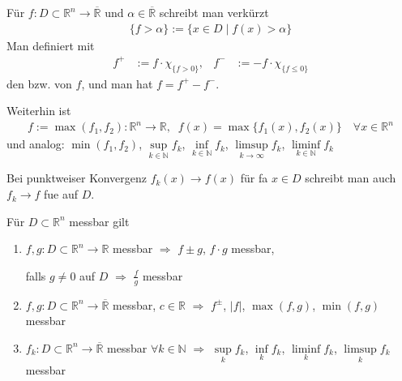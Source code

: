 \begin{*definition}
Für $f:D\subset\mathbb{R}^n\to\overline{\mathbb{R}}$ und $\alpha\in\overline{\mathbb{R}}$ schreibt man verkürzt
\begin{align*}
\{ f > \alpha \} := \{ x\in D \mid f(x) > \alpha \}
\end{align*}
Man definiert mit \begin{align*}
	f^{+} &:= f\cdot \chi_{\{f > 0\}}, & f^{-} &:= -f\cdot \chi_{\{f \le 0\}}
\end{align*}
den  bzw.  von $f$, und man hat $f = f^+ - f^-$.

Weiterhin ist 
\begin{align*}
f:=\max(f_1, f_2):\mathbb{R}^n\to\mathbb{R},\;\;f(x) = \max \{ f_1(x), f_2(x) \} \quad \forall x\in\mathbb{R}^n
\end{align*}
und analog: $\min(f_1, f_2)$, $\sup\limits_{k\in\mathbb{N}} f_k$, $\inf\limits_{k\in\mathbb{N}} f_k$, $\limsup\limits_{k\to\infty} f_k$, $\liminf\limits_{k\in\mathbb{N}} f_k$

Bei punktweiser Konvergenz $f_k(x)\to f(x)$ für \gls{fa} $x\in D$ schreibt man auch $f_k\to f$ \gls{fue} auf $D$.
\end{*definition}

\begin{proposition}
	Für $D\subset\mathbb{R}^n$ messbar gilt \begin{enumerate}[label={\alph*)}]
		\item {}
		$f,g:D\subset\mathbb{R}^n\to\mathbb{R}$ messbar $\Rightarrow$ $f\pm g$, $f\cdot g$ messbar,
		
		falls $g\neq 0$ auf $D$ $\Rightarrow$ $\frac{f}{g}$ messbar
		\item {}
		$f,g:D\subset\mathbb{R}^n\to\overline{\mathbb{R}}$ messbar, $c\in\mathbb{R}$ $\Rightarrow$ $f^{\pm}$, $\vert f \vert$, $\max(f,g)$, $\min(f,g)$ messbar
		\item {}
		$f_k:D\subset\mathbb{R}^n\to\overline{\mathbb{R}}$ messbar $\forall k\in\mathbb{N}$ $\Rightarrow$ $\sup\limits_{k} f_k$, $\inf\limits_{k} f_k$, $\liminf\limits_{k} f_k$, $\limsup\limits_{k} f_k$ messbar
	\end{enumerate}
\end{proposition}

